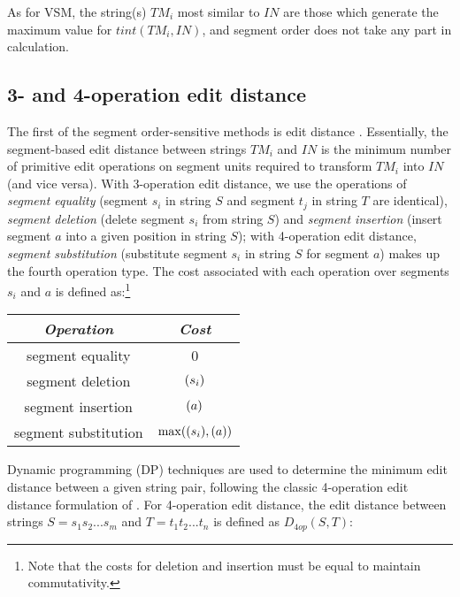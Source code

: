 As for VSM, the string(s) $TM_i$ most similar to $IN$ are those which
generate the maximum value for $\mathit{tint}(TM_i,IN)$, and segment
order does not take any part in calculation.



\subsection*{3- and 4-operation edit distance}

The first of the segment order-sensitive methods is edit distance
\cite{Wagner74,Planas99}. Essentially, the segment-based edit distance
between strings $TM_i$ and $IN$ is the minimum number of primitive edit
operations on segment units required to transform $TM_i$ into $IN$ (and
vice versa). With 3-operation edit distance, we use the operations of
{\it segment equality} (segment $s_i$ in string $S$ and segment $t_j$
in string $T$ are identical), {\it segment deletion} (delete segment
$s_i$ from string $S$) and {\it segment insertion} (insert segment
$a$ into a given position in string $S$); with 4-operation edit
distance, {\it segment substitution} (substitute segment $s_i$ in
string $S$ for segment $a$) makes up the fourth operation type.  The
cost associated with each operation over segments $s_i$ and $a$ is
defined as:\footnote{Note that the costs for deletion and insertion must
  be equal to maintain commutativity.}
\begin{addframe}
  \begin{tabular}{c|c}
    {\bf \it Operation} & {\bf \it Cost}  \\
    \hline
    segment equality & 0\\
    segment deletion & $(s_i)$\\
    segment insertion & $(a)$\\
    segment substitution & $\max((s_i),(a))$
  \end{tabular}
\end{addframe}

Dynamic programming (DP) techniques are used to determine the minimum
edit distance between a given string pair, following the classic
4-operation edit distance formulation of . For 4-operation
edit distance, the edit distance between strings $S=s_1 s_2 ...
  s_m$ and $T=t_1 t_2 ... t_n$ is defined as $D_{4op}(S,T)$:

